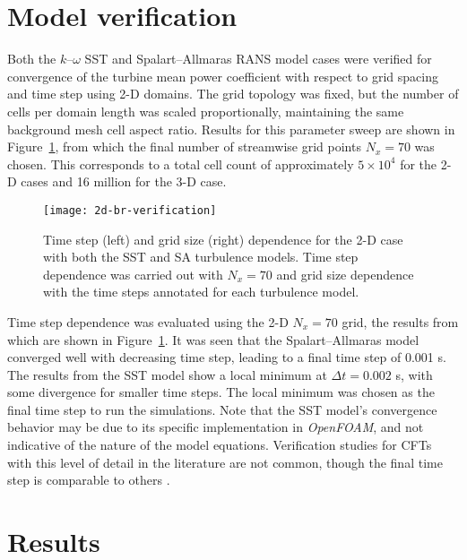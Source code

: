 \section{Model verification}

Both the $k$--$\omega$ SST and Spalart--Allmaras RANS model cases were verified
for convergence of the turbine mean power coefficient with respect to grid
spacing and time step using 2-D domains. The grid topology was fixed, but the
number of cells per domain length was scaled proportionally, maintaining the
same background mesh cell aspect ratio. Results for this parameter sweep are
shown in Figure~\ref{fig:2d-br-verification}, from which the final number of
streamwise grid points $N_x = 70$ was chosen. This corresponds to a total cell
count of approximately $5 \times 10^4$ for the 2-D cases and 16 million for the
3-D case.

\begin{figure}
    \centering

    \texttt{[image: 2d-br-verification]}

    \caption{Time step (left) and grid size (right) dependence for the 2-D case
        with both the SST and SA turbulence models. Time step dependence was carried
        out with $N_x=70$ and grid size dependence with the time steps annotated for
        each turbulence model.}

    \label{fig:2d-br-verification}
\end{figure}

Time step dependence was evaluated using the 2-D $N_x=70$ grid, the results from
which are shown in Figure~\ref{fig:2d-br-verification}. It was seen that the
Spalart--Allmaras model converged well with decreasing time step, leading to a
final time step of 0.001 s. The results from the SST model show a local minimum
at $\Delta t = 0.002$ s, with some divergence for smaller time steps. The local
minimum was chosen as the final time step to run the simulations. Note that the
SST model's convergence behavior may be due to its specific implementation in
\textit{OpenFOAM}, and not indicative of the nature of the model equations.
Verification studies for CFTs with this level of detail in the literature are
not common, though the final time step is comparable to others
\cite{Balduzzi2016}.


\section{Results}

